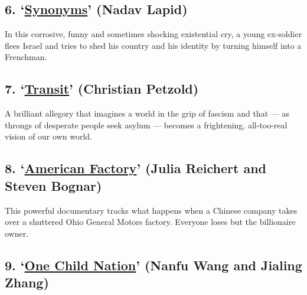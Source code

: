 \hypertarget{6-synonyms-nadav-lapid}{%
\subsection{\texorpdfstring{6.
`\href{https://www.nytimes.com/2019/10/24/movies/synonyms-review.html}{Synonyms}'
(Nadav
Lapid)}{6. `Synonyms' (Nadav Lapid)}}\label{6-synonyms-nadav-lapid}}

In this corrosive, funny and sometimes shocking existential cry, a young
ex-soldier flees Israel and tries to shed his country and his identity
by turning himself into a Frenchman.

\hypertarget{7-transit-christian-petzold}{%
\subsection{\texorpdfstring{7.
`\href{https://www.nytimes.com/2019/02/28/movies/transit-review.html}{Transit}'
(Christian
Petzold)}{7. `Transit' (Christian Petzold)}}\label{7-transit-christian-petzold}}

A brilliant allegory that imagines a world in the grip of fascism and
that --- as throngs of desperate people seek asylum --- becomes a
frightening, all-too-real vision of our own world.

\hypertarget{8-american-factory-julia-reichert-and-steven-bognar}{%
\subsection{\texorpdfstring{8.
`\href{https://www.nytimes.com/2019/08/20/movies/american-factory-review.html}{American
Factory}' (Julia Reichert and Steven
Bognar)}{8. `American Factory' (Julia Reichert and Steven Bognar)}}\label{8-american-factory-julia-reichert-and-steven-bognar}}

This powerful documentary tracks what happens when a Chinese company
takes over a shuttered Ohio General Motors factory. Everyone loses but
the billionaire owner.

\hypertarget{9-one-child-nation-nanfu-wang-and-jialing-zhang}{%
\subsection{\texorpdfstring{9.
`\href{https://www.nytimes.com/2019/08/08/movies/one-child-nation-review.html}{One
Child Nation}' (Nanfu Wang and Jialing
Zhang)}{9. `One Child Nation' (Nanfu Wang and Jialing Zhang)}}\label{9-one-child-nation-nanfu-wang-and-jialing-zhang}}

